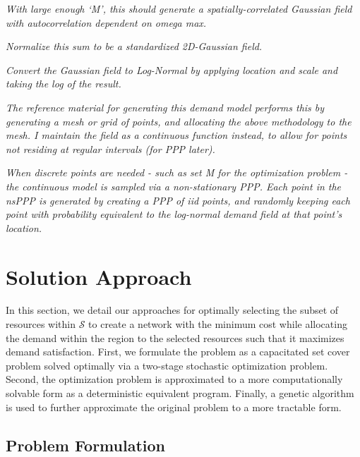 \documentclass[onecolumn,draftcls]{IEEEtran}
\begin{document}
\textit{With large enough `M', this should generate a spatially-correlated Gaussian field with autocorrelation dependent on omega max.}
		
\textit{Normalize this sum to be a standardized 2D-Gaussian field.}
		
\textit{Convert the Gaussian field to Log-Normal by applying location and scale and taking the log of the result.}
		
\textit{The reference material for generating this demand model performs this by generating a mesh or grid of points, and allocating the above methodology to the mesh.  I maintain the field as a continuous function instead, to allow for points not residing at regular intervals (for PPP later).}

\textit{When discrete points are needed - such as set M for the optimization problem - the continuous model is sampled via a non-stationary PPP.  Each point in the nsPPP is generated by creating a PPP of iid points, and randomly keeping each point with probability equivalent to the log-normal demand field at that point's location.}
\fi

\section{Solution Approach}

In this section, we detail our approaches for optimally selecting the subset of resources within $\mathcal{S}$ to create a network with the minimum cost while allocating the demand within the region to the selected resources such that it maximizes demand satisfaction.  First, we formulate the problem as a capacitated set cover problem solved optimally via a two-stage stochastic optimization problem.  Second, the optimization problem is approximated to a more computationally solvable form as a deterministic equivalent program.  Finally, a genetic algorithm is used to further approximate the original problem to a more tractable form.


\subsection{Problem Formulation}
\end{document}
